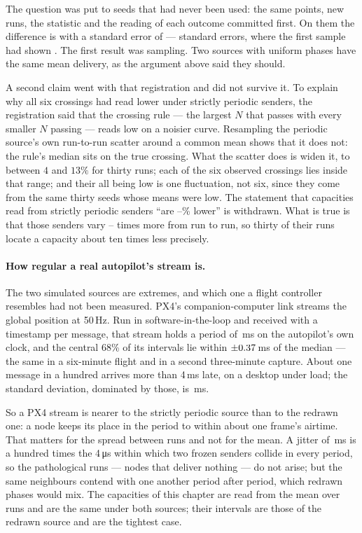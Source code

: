 \begin{remark}
The question was put to seeds that had never been used: the same \srcPoints{} points,
\srcFreshRuns{} new runs, the statistic and the reading of each outcome committed first. On
them the difference is \srcFreshD{} with a standard error of \srcFreshSe{} ---
\srcFreshZ{} standard errors, where the first sample had shown \srcFirstZ. The first result
was sampling. Two sources with uniform phases have the same mean delivery, as the argument
above said they should.

A second claim went with that registration and did not survive it. To explain why all six
crossings had read lower under strictly periodic senders, the registration said that the crossing rule ---
the largest $N$ that passes with every smaller $N$ passing --- reads low on a noisier curve.
Resampling the periodic source's own run-to-run scatter around a common mean shows that it does
not: the rule's median sits on the true crossing. What the scatter does is widen it, to between
$4$ and $13\%$ for thirty runs; each of the six observed crossings lies inside that range; and
their all being low is one fluctuation, not six, since they come from the same thirty seeds
whose means were low. The statement that capacities read from strictly periodic senders ``are
\srcShiftLo--\srcShiftHi\% lower'' is withdrawn. What is true is that those senders vary
\srcSpreadLo--\srcSpreadHi{} times more from run to run, so thirty of their runs locate a
capacity about ten times less precisely.
\end{remark}

\paragraph{How regular a real autopilot's stream is.} The two simulated sources are extremes,
and which one a flight controller resembles had not been measured. PX4's companion-computer
link streams the global position at 50\,Hz. Run in software-in-the-loop and received with a
timestamp per message, that stream holds a period of \sitlPeriod\,ms on the autopilot's own
clock, and the central 68\% of its intervals lie within $\pm0.37$\,ms of the median
--- the same in a six-minute flight and in a second three-minute capture. About one message in
a hundred arrives more than 4\,ms late, on a desktop under load; the standard deviation,
dominated by those, is \sitlSd\,ms.

So a PX4 stream is nearer to the strictly periodic source than to the redrawn one: a node keeps
its place in the period to within about one frame's airtime. That matters for the spread
between runs and not for the mean. A jitter of \sitlJitter\,ms is a hundred times the
4\,\si{\micro\second} within which two frozen senders collide in every period, so the
pathological runs --- nodes that deliver nothing --- do not arise; but the same neighbours
contend with one another period after period, which redrawn phases would mix. The capacities of
this chapter are read from the mean over runs and are the same under both sources; their
intervals are those of the redrawn source and are the tightest case.

